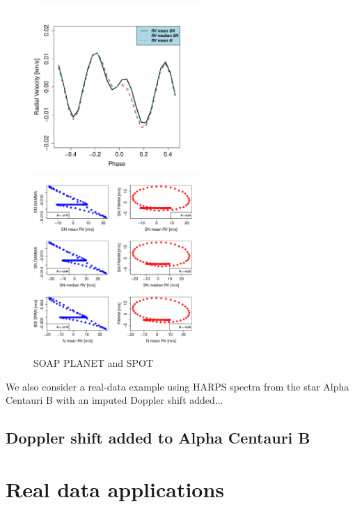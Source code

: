 \documentclass[11pt, oneside]{article}
\begin{document}
\begin{figure}[htbp]
   \centering
\includegraphics[height = 2.5in]{RV_comparison_PLANET_SPOT.pdf} 
\includegraphics[height = 2.5in]{SOAP_SPOT_PLANET_Comparison_para_SN.pdf} 
   \caption{SOAP PLANET and SPOT}
    \label{fig:spot.plus.planet}
\end{figure}

We also consider a real-data example using HARPS spectra from the star Alpha Centauri B with an imputed Doppler shift added...

\subsection{Doppler shift added to Alpha Centauri B} \label{sec:soap_real}


\section{Real data applications} \label{sec:4}
\end{document}

